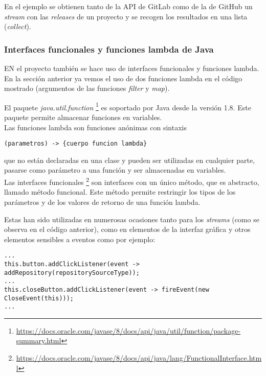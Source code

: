 En el ejemplo se obtienen tanto de la API de GitLab como de la de GitHub un \textit{stream} con las \textit{releases} de un proyecto y se recogen los resultados en una lista (\textit{collect}).


\subsubsection{Interfaces funcionales y funciones lambda de Java}

EN el proyecto también se hace uso de interfaces funcionales y funciones lambda. En la sección anterior ya vemos el uso de dos funciones lambda en el código mostrado (argumentos de las funciones \textit{filter} y \textit{map}).

El paquete \textit{java.util.function} \footnote{\url{https://docs.oracle.com/javase/8/docs/api/java/util/function/package-summary.html}} es soportado por Java desde la versión 1.8. Este paquete permite almacenar funciones en variables. 
\\Las funciones lambda son funciones anónimas con sintaxis \\
\begin{minipage}{\linewidth}
{\tiny
\begin{verbatim}
(parametros) -> {cuerpo funcion lambda}
\end{verbatim}
}
\end{minipage}
que no están declaradas en una clase y pueden ser utilizadas en cualquier parte, pasarse como parámetro a una función y ser almacenadas en variables.
\\Las interfaces funcionales \footnote{\url{https://docs.oracle.com/javase/8/docs/api/java/lang/FunctionalInterface.html}} son interfaces con un único método, que es abstracto, llamado método funcional. Este método permite restringir los tipos de los parámetros y de los valores de retorno de una función lambda.

Estas han sido utilizadas en numerosas ocasiones tanto para los \textit{streams} (como se observa en el código anterior), como en elementos de la interfaz gráfica y otros elementos sensibles a eventos como por ejemplo:\\

\begin{minipage}{\linewidth}
{\tiny
\begin{verbatim}
...
this.button.addClickListener(event -> addRepository(repositorySourceType));
...
this.closeButton.addClickListener(event -> fireEvent(new CloseEvent(this)));
...
\end{verbatim}
}
\end{minipage}

